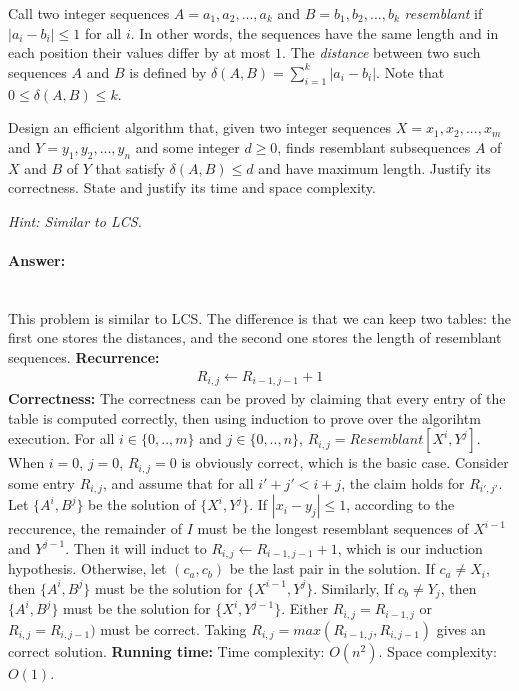 \documentclass[11pt]{article}
\begin{document}

\begin{problem}
Call two integer sequences $A = a_1,a_2,...,a_k$ and $B = b_1,b_2,...,b_k$ \emph{resemblant}  if $|a_i - b_i| \le 1$ for all $i$. In other words, the sequences have the same length and  in each position their values differ by at most $1$. The \emph{distance} between two such sequences $A$ and $B$ is defined by $\delta(A,B) = \sum_{i=1}^k |a_i - b_i|$. Note that $0 \le \delta(A,B)\le k$.

Design an efficient algorithm that, given two integer sequences $X = x_1,x_2,...,x_m$ and $Y = y_1,y_2,...,y_n$ and some integer $d\ge 0$, 
finds resemblant subsequences $A$ of $X$ and $B$ of $Y$ that satisfy $\delta(A,B) \le d$ 
and have maximum length. Justify its correctness.  State and justify its time and space complexity.  

\noindent\emph{Hint: Similar to LCS.}
\end{problem}

\paragraph{Answer: }\mbox{} \\
This problem is similar to LCS. The difference is that we can keep two tables: the first one stores the distances, and the second one stores the length of resemblant sequences. \newline
\textbf{Recurrence: }
\begin{gather*}
    R_{i,j} \gets R_{i-1,j-1} + 1
\end{gather*}
\textbf{Correctness: }The correctness can be proved by claiming that every entry of the table is computed correctly, then using induction to prove over the algorihtm execution. \newline
{}For all $i \in \{0,..,m\}$ and $j \in \{0,..,n\}$, $R_{i,j} = Resemblant[X^i, Y^j]$. \newline
{}\newline
When $i = 0$, $j = 0$, $R_{i,j} = 0$ is obviously correct, which is the basic case. Consider some entry $R_{i,j}$, and assume that for all $i' + j' < i + j$, the claim holds for $R_{i',j'}$. Let $\{A^i, B^j\}$ be the solution of $\{X^i, Y^j\}$. \newline
If $|x_i - y_j| \leq 1$, according to the reccurence, the remainder of $I$ must be the longest resemblant sequences of $X^{i-1}$ and $Y^{j-1}$. Then it will induct to $R_{i,j} \gets R_{i-1,j-1} + 1$, which is our induction hypothesis.
Otherwise, let $(c_a, c_b)$ be the last pair in the solution. If $c_a \neq X_i$, then $\{A^i, B^j\}$ must be the solution for $\{X^{i-1}, Y^j\}$. Similarly, If $c_b \neq Y_j$, then $\{A^i, B^j\}$ must be the solution for $\{X^i, Y^{j-1}\}$. Either $R_{i,j} = R_{i-1,j}$ or $R_{i,j} = R_{i,j-1})$ must be correct. Taking $R_{i,j} = max(R_{i-1,j}, R_{i,j-1})$ gives an correct solution. \newline
\textbf{Running time: }Time complexity: $O(n^2)$. Space complexity: $O(1)$.
\end{document}
